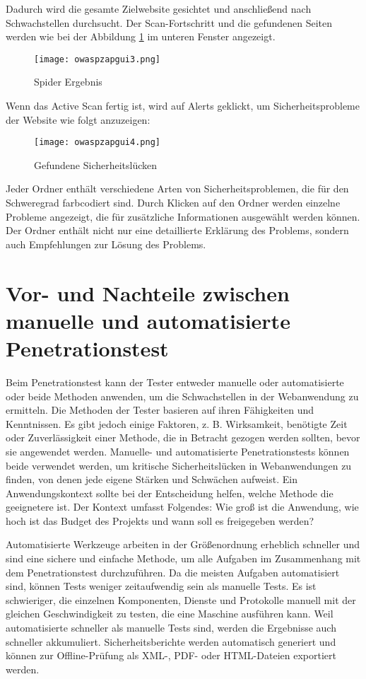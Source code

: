 Dadurch wird die gesamte Zielwebsite gesichtet und anschließend nach Schwachstellen durchsucht. Der Scan-Fortschritt und die gefundenen Seiten werden wie bei der Abbildung \ref{quickscan3} im unteren Fenster angezeigt.

\newpage

\begin{figure}[h]
	\centering
	\texttt{[image: owaspzapgui3.png]}
	\caption{Spider Ergebnis}
	\label{quickscan3}
\end{figure}

Wenn das Active Scan fertig ist, wird auf Alerts geklickt, um Sicherheitsprobleme der Website wie folgt anzuzeigen:

\begin{figure}[h]
	\centering
	\texttt{[image: owaspzapgui4.png]}
	\caption{Gefundene Sicherheitslücken}
	\label{quickscan4}
\end{figure}

Jeder Ordner enthält verschiedene Arten von Sicherheitsproblemen, die für den Schweregrad farbcodiert sind. Durch Klicken auf den Ordner werden einzelne Probleme angezeigt, die für zusätzliche Informationen ausgewählt werden können. Der Ordner enthält nicht nur eine detaillierte Erklärung des Problems, sondern auch Empfehlungen zur Lösung des Problems.

\section{Vor- und Nachteile zwischen manuelle und automatisierte Penetrationstest}

Beim Penetrationstest kann der Tester entweder manuelle oder automatisierte oder beide Methoden anwenden, um die Schwachstellen in der Webanwendung zu ermitteln. Die Methoden der Tester basieren auf ihren Fähigkeiten und Kenntnissen. Es gibt jedoch einige Faktoren, z. B. Wirksamkeit, benötigte Zeit oder Zuverlässigkeit einer Methode, die in Betracht gezogen werden sollten, bevor sie angewendet werden. Manuelle- und automatisierte Penetrationstests können beide verwendet werden, um kritische Sicherheitslücken in Webanwendungen zu finden, von denen jede eigene Stärken und Schwächen aufweist. Ein Anwendungskontext sollte bei der Entscheidung helfen, welche Methode die geeignetere ist. Der Kontext umfasst Folgendes: Wie groß ist die Anwendung, wie hoch ist das Budget des Projekts und wann soll es freigegeben werden?

Automatisierte Werkzeuge arbeiten in der Größenordnung erheblich schneller und sind eine sichere und einfache Methode, um alle Aufgaben im Zusammenhang mit dem Penetrationstest durchzuführen. Da die meisten Aufgaben automatisiert sind, können Tests weniger zeitaufwendig sein als manuelle Tests. Es ist schwieriger, die einzelnen Komponenten, Dienste und Protokolle manuell mit der gleichen Geschwindigkeit zu testen, die eine Maschine ausführen kann. Weil automatisierte schneller als manuelle Tests sind, werden die Ergebnisse auch schneller akkumuliert. Sicherheitsberichte werden automatisch generiert und können zur Offline-Prüfung als XML-, PDF- oder HTML-Dateien exportiert werden\cite{autovorteil99}.

